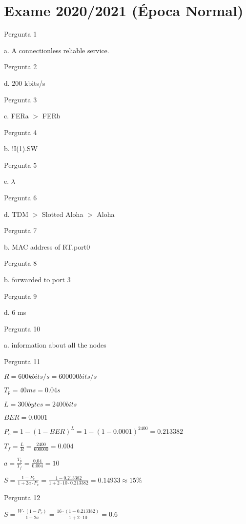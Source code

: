 \documentclass[addpoints]{exam}
\begin{document}
\section*{Exame 2020/2021 (Época Normal)}

\begin{questions}

\question Pergunta 1

a. A connectionless reliable service.

\question Pergunta 2

d. 200 kbits/s

\question Pergunta 3

c. FERa $>$ FERb

\question Pergunta 4

b. !I(1).SW

\question Pergunta 5

e. $\lambda$

\question Pergunta 6

d. TDM $>$ Slotted Aloha $>$ Aloha

\question Pergunta 7

b. MAC address of RT.port0

\question Pergunta 8

b. forwarded to port 3

\question Pergunta 9

d. 6 ms 

\question Pergunta 10

a. information about all the nodes

\question Pergunta 11

$R = 600 kbits/s = 600000 bits/s$

$T_{p} = 40 ms = 0.04 s$

$L = 300 bytes = 2400 bits$

$BER = 0.0001$

$
P_{e} = 1 - (1 - BER)^{L}
      = 1 - (1 - 0.0001)^{2400}  
      = 0.213382
$

$
T_{f} = \frac{L}{R}
      = \frac{2400}{600000}
      = 0.004
$

$
a = \frac{T_{p}}{T_{f}}
  = \frac{0.04}{0.004}
  = 10
$

$
S = \frac{1 - P_{e}}{1 + 2a \cdot P_{e}}
  = \frac{1 - 0.213382}{1 + 2 \cdot 10 \cdot 0.213382}
  = 0.14933
  \approx 15\%
$

\question Pergunta 12

$
S = \frac{W \cdot (1 - P_{e})}{1 + 2a}
  = \frac{16 \cdot (1 - 0.213382)}{1 + 2 \cdot 10}
  = 0.6
$


\end{questions}
\end{document}
